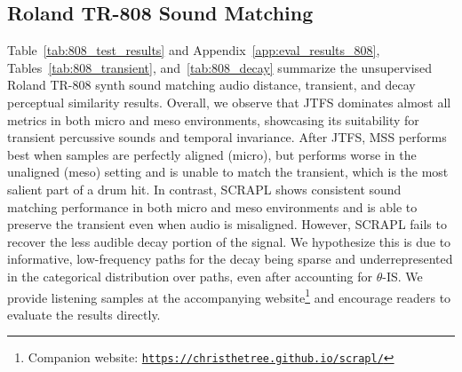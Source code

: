 \documentclass{article} %
\theoremstyle{plain}
\theoremstyle{definition}
\theoremstyle{remark}
\begin{document}
\subsection{Roland TR-808 Sound Matching}
\label{ssec:results_808}
\vspace{-3pt}

Table~\ref{tab:808_test_results} and Appendix~\ref{app:eval_results_808}, Tables~\ref{tab:808_transient}, and~\ref{tab:808_decay} summarize the unsupervised Roland TR-808 synth sound matching audio distance, transient, and decay perceptual similarity results.
Overall, we observe that JTFS dominates almost all metrics in both micro and meso environments, showcasing its suitability for transient percussive sounds and temporal invariance.
After JTFS, MSS performs best when samples are perfectly aligned (micro), but performs worse in the unaligned (meso) setting and is unable to match the transient, which is the most salient part of a drum hit.
In contrast, SCRAPL shows consistent sound matching performance in both micro and meso environments and is able to preserve the transient even when audio is misaligned.
However, SCRAPL fails to recover the less audible decay portion of the signal.
We hypothesize this is due to informative, low-frequency paths for the decay being sparse and underrepresented in the categorical distribution over paths, even after accounting for $\theta$-IS.
We provide listening samples at the accompanying website\footnote{Companion website: \texttt{\url{https://christhetree.github.io/scrapl/}}} and encourage readers to evaluate the results directly.
\vspace{-3pt}
\end{document}

